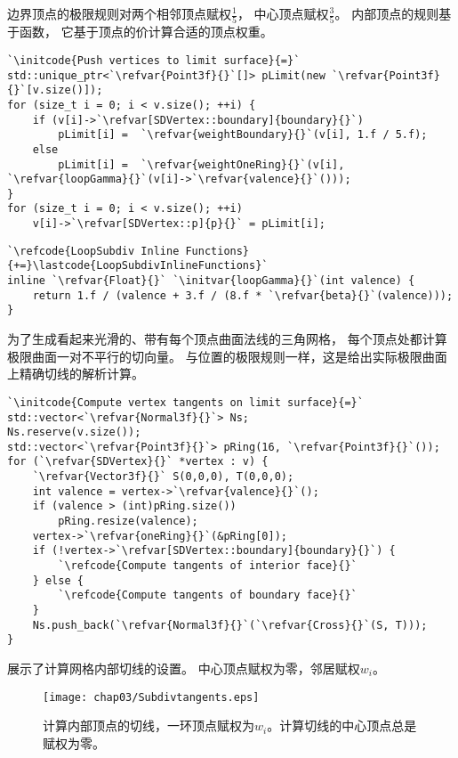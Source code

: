 边界顶点的极限规则对两个相邻顶点赋权$\displaystyle\frac{1}{5}$，
中心顶点赋权$\displaystyle\frac{3}{5}$。
内部顶点的规则基于函数，
它基于顶点的价计算合适的顶点权重。
\begin{lstlisting}
`\initcode{Push vertices to limit surface}{=}`
std::unique_ptr<`\refvar{Point3f}{}`[]> pLimit(new `\refvar{Point3f}{}`[v.size()]);
for (size_t i = 0; i < v.size(); ++i) {
    if (v[i]->`\refvar[SDVertex::boundary]{boundary}{}`)
        pLimit[i] =  `\refvar{weightBoundary}{}`(v[i], 1.f / 5.f);
    else
        pLimit[i] =  `\refvar{weightOneRing}{}`(v[i], `\refvar{loopGamma}{}`(v[i]->`\refvar{valence}{}`()));
}
for (size_t i = 0; i < v.size(); ++i)
    v[i]->`\refvar[SDVertex::p]{p}{}` = pLimit[i];
\end{lstlisting}
\begin{lstlisting}
`\refcode{LoopSubdiv Inline Functions}{+=}\lastcode{LoopSubdivInlineFunctions}`
inline `\refvar{Float}{}` `\initvar{loopGamma}{}`(int valence) {
    return 1.f / (valence + 3.f / (8.f * `\refvar{beta}{}`(valence)));
}
\end{lstlisting}

为了生成看起来光滑的、带有每个顶点曲面法线的三角网格，
每个顶点处都计算极限曲面一对不平行的切向量。
与位置的极限规则一样，这是给出实际极限曲面上精确切线的解析计算。
\begin{lstlisting}
`\initcode{Compute vertex tangents on limit surface}{=}`
std::vector<`\refvar{Normal3f}{}`> Ns;
Ns.reserve(v.size());
std::vector<`\refvar{Point3f}{}`> pRing(16, `\refvar{Point3f}{}`());
for (`\refvar{SDVertex}{}` *vertex : v) {
    `\refvar{Vector3f}{}` S(0,0,0), T(0,0,0);
    int valence = vertex->`\refvar{valence}{}`();
    if (valence > (int)pRing.size())
        pRing.resize(valence);
    vertex->`\refvar{oneRing}{}`(&pRing[0]);
    if (!vertex->`\refvar[SDVertex::boundary]{boundary}{}`) {
        `\refcode{Compute tangents of interior face}{}`
    } else {
        `\refcode{Compute tangents of boundary face}{}`
    }
    Ns.push_back(`\refvar{Normal3f}{}`(`\refvar{Cross}{}`(S, T)));
}
\end{lstlisting}

展示了计算网格内部切线的设置。
中心顶点赋权为零，邻居赋权$w_i$。
\begin{figure}[htbp]
    \centering\texttt{[image: chap03/Subdivtangents.eps]}
    \caption{计算内部顶点的切线，一环顶点赋权为$w_i$。计算切线的中心顶点总是赋权为零。}
    \label{fig:3.37}
\end{figure}

